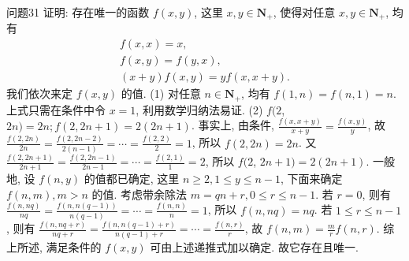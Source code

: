 问题31 证明: 存在唯一的函数 $f(x, y)$, 这里 $x, y \in \mathbf{N}_{+}$, 使得对任意 $x, y \in \mathbf{N}_{+}$, 均有
$$
\begin{gathered}
f(x, x)=x, \\
f(x, y)=f(y, x), \\
(x+y) f(x, y)=y f(x, x+y) .
\end{gathered}
$$
我们依次来定 $f(x, y)$ 的值.
(1) 对任意 $n \in \mathbf{N}_{+}$, 均有 $f(1, n)= f(n, 1)=n$. 上式只需在条件中令 $x=1$, 利用数学归纳法易证.
(2) $f(2$, $2 n)=2 n ; f(2,2 n+1)=2(2 n+1)$. 事实上, 由条件, $\frac{f(x, x+y)}{x+y}= \frac{f(x, y)}{y}$, 
故 $\frac{f(2,2 n)}{2 n}=\frac{f(2,2 n-2)}{2(n-1)}=\cdots=\frac{f(2,2)}{2}=1$, 所以 $f(2,2 n)=2 n$. 又 $\frac{f(2,2 n+1)}{2 n+1}=\frac{f(2,2 n-1)}{2 n-1}=\cdots=\frac{f(2,1)}{1}=2$, 所以 $f(2$, $2 n+1)=2(2 n+1)$. 
一般地, 设 $f(n, y)$ 的值都已确定, 这里 $n \geqslant 2,1 \leqslant y \leqslant n-1$, 下面来确定 $f(n, m), m>n$ 的值.
考虑带余除法 $m=q n+r, 0 \leqslant r \leqslant n-1$. 若 $r=0$, 则有 $\frac{f(n, n q)}{n q}=\frac{f(n, n(q-1))}{n(q-1)}=\cdots=\frac{f(n, n)}{n}=1$, 所以 $f(n, n q)=n q$. 
若 $1 \leqslant r \leqslant n-1$, 则有 $\frac{f(n, n q+r)}{n q+r}= \frac{f(n, n(q-1)+r)}{n(q-1)+r}=\cdots=\frac{f(n, r)}{r}$, 故 $f(n, m)=\frac{m}{r} f(n, r)$. 
综上所述, 满足条件的 $f(x, y)$ 可由上述递推式加以确定.
故它存在且唯一.


